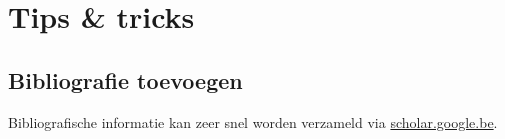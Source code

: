 \documentclass[kulak]{kulakarticle} %
\begin{document}





\section{Tips \& tricks}
\label{sec:tips}

\subsection{Bibliografie toevoegen}
Bibliografische informatie kan zeer snel worden verzameld via
\href{http://scholar.google.be/}{scholar.google.be}.
\end{document}
